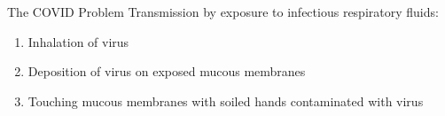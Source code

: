 \begin{slide}{The COVID Problem}
	Transmission by exposure to infectious respiratory fluids:
	\begin{enumerate}
		\item Inhalation of virus
		\item Deposition of virus on exposed mucous membranes
		\item Touching mucous membranes with soiled hands contaminated with virus
	\end{enumerate}
\end{slide}